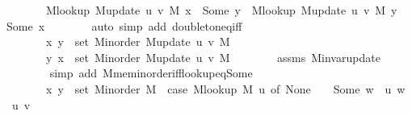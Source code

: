 \begin{isabellebody}
\ \ \ \ \ \ \ M{\isacharunderscore}{\kern0pt}lookup\ {\isacharparenleft}{\kern0pt}M{\isacharunderscore}{\kern0pt}update\ u\ v\ M{\isacharparenright}{\kern0pt}\ x\ {\isacharequal}{\kern0pt}\ Some\ y\ {\isasymor}\ M{\isacharunderscore}{\kern0pt}lookup\ {\isacharparenleft}{\kern0pt}M{\isacharunderscore}{\kern0pt}update\ u\ v\ M{\isacharparenright}{\kern0pt}\ y\ {\isacharequal}{\kern0pt}\ Some\ x{\isachardoublequoteclose}\isanewline
\ \ \ \ \ \ \isamarkupfalse%
\ {\isacharparenleft}{\kern0pt}auto\ simp\ add{\isacharcolon}{\kern0pt}\ doubleton{\isacharunderscore}{\kern0pt}eq{\isacharunderscore}{\kern0pt}iff{\isacharparenright}{\kern0pt}\isanewline
\ \ \ \ \isamarkupfalse%
\ \isamarkupfalse%
\isanewline
\ \ \ \ \ \ {\isachardoublequoteopen}{\isachardot}{\kern0pt}{\isachardot}{\kern0pt}{\isachardot}{\kern0pt}\ {\isasymlongleftrightarrow}\isanewline
\ \ \ \ \ \ \ {\isacharparenleft}{\kern0pt}x{\isacharcomma}{\kern0pt}\ y{\isacharparenright}{\kern0pt}\ {\isasymin}\ set\ {\isacharparenleft}{\kern0pt}M{\isacharunderscore}{\kern0pt}inorder\ {\isacharparenleft}{\kern0pt}M{\isacharunderscore}{\kern0pt}update\ u\ v\ M{\isacharparenright}{\kern0pt}{\isacharparenright}{\kern0pt}\ {\isasymor}\isanewline
\ \ \ \ \ \ \ {\isacharparenleft}{\kern0pt}y{\isacharcomma}{\kern0pt}\ x{\isacharparenright}{\kern0pt}\ {\isasymin}\ set\ {\isacharparenleft}{\kern0pt}M{\isacharunderscore}{\kern0pt}inorder\ {\isacharparenleft}{\kern0pt}M{\isacharunderscore}{\kern0pt}update\ u\ v\ M{\isacharparenright}{\kern0pt}{\isacharparenright}{\kern0pt}{\isachardoublequoteclose}\isanewline
\ \ \ \ \ \ \isamarkupfalse%
\ assms\ M{\isachardot}{\kern0pt}invar{\isacharunderscore}{\kern0pt}update\isanewline
\ \ \ \ \ \ \isamarkupfalse%
\ {\isacharparenleft}{\kern0pt}simp\ add{\isacharcolon}{\kern0pt}\ M{\isachardot}{\kern0pt}mem{\isacharunderscore}{\kern0pt}inorder{\isacharunderscore}{\kern0pt}iff{\isacharunderscore}{\kern0pt}lookup{\isacharunderscore}{\kern0pt}eq{\isacharunderscore}{\kern0pt}Some{\isacharparenright}{\kern0pt}\isanewline
\ \ \ \ \isamarkupfalse%
\ \isamarkupfalse%
\isanewline
\ \ \ \ \ \ {\isachardoublequoteopen}{\isachardot}{\kern0pt}{\isachardot}{\kern0pt}{\isachardot}{\kern0pt}\ {\isasymlongleftrightarrow}\isanewline
\ \ \ \ \ \ \ {\isacharparenleft}{\kern0pt}x{\isacharcomma}{\kern0pt}\ y{\isacharparenright}{\kern0pt}\ {\isasymin}\ set\ {\isacharparenleft}{\kern0pt}M{\isacharunderscore}{\kern0pt}inorder\ M{\isacharparenright}{\kern0pt}\ {\isacharminus}{\kern0pt}\ {\isacharparenleft}{\kern0pt}case\ M{\isacharunderscore}{\kern0pt}lookup\ M\ u\ of\ None\ {\isasymRightarrow}\ {\isacharbraceleft}{\kern0pt}{\isacharbraceright}{\kern0pt}\ {\isacharbar}{\kern0pt}\ Some\ w\ {\isasymRightarrow}\ {\isacharbraceleft}{\kern0pt}{\isacharparenleft}{\kern0pt}u{\isacharcomma}{\kern0pt}\ w{\isacharparenright}{\kern0pt}{\isacharbraceright}{\kern0pt}{\isacharparenright}{\kern0pt}\ {\isasymunion}\ {\isacharbraceleft}{\kern0pt}{\isacharparenleft}{\kern0pt}u{\isacharcomma}{\kern0pt}\ v{\isacharparenright}{\kern0pt}{\isacharbraceright}{\kern0pt}\ {\isasymor}\isanewline

\end{isabellebody}
